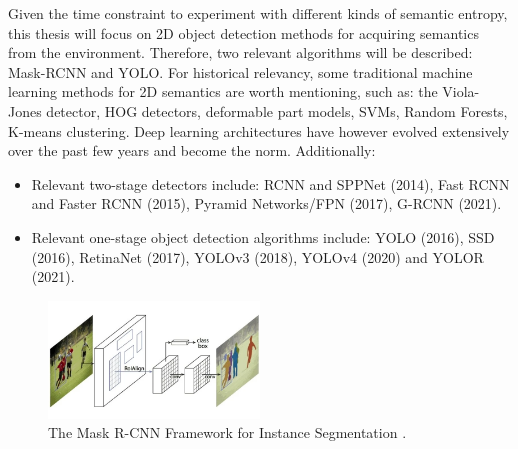 Given the time constraint to experiment with different kinds of semantic entropy, this thesis will focus on 2D object detection methods for acquiring semantics from the environment. Therefore, two relevant algorithms will be described: Mask-RCNN and YOLO. For historical relevancy, 
some traditional machine learning methods for 2D semantics are worth mentioning, such as: the Viola-Jones detector, HOG detectors, deformable part models, SVMs, Random Forests, K-means clustering. Deep learning architectures have however evolved extensively over the past few years and become the norm. Additionally:
\begin{itemize}
    \item Relevant two-stage detectors include: RCNN and SPPNet (2014), Fast RCNN and Faster RCNN (2015), Pyramid Networks/FPN (2017), G-RCNN (2021).
    \item Relevant one-stage object detection algorithms include: YOLO (2016), SSD (2016), RetinaNet (2017), YOLOv3 (2018), YOLOv4 (2020) and YOLOR (2021).
\end{itemize}

\begin{figure}[!ht]
        \centering
        \includegraphics[width=0.5\textwidth]{images/maskrcnn.png}
        \caption{The Mask R-CNN Framework for Instance Segmentation \cite{visoai2021detection}.}
        \label{fig:maskrcnn}
    \end{figure}

